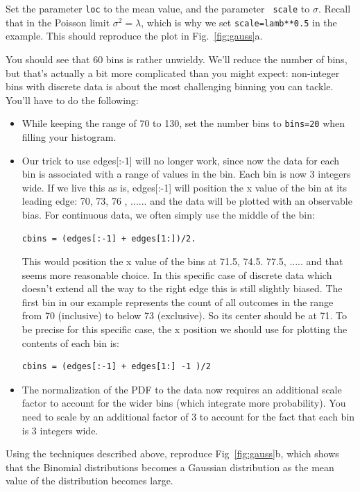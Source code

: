\begin{plot} Set the parameter {\tt loc} to the mean value, and the parameter {\tt
  scale} to $\sigma$.  Recall that in the Poisson limit $\sigma^2 =
\lambda$, which is why we set {\tt scale=lamb**0.5} in the example.
This should reproduce the plot in Fig.~\ref{fig:gauss}a. \end{plot}

You should see that 60 bins is rather unwieldy.  We'll reduce the number
of bins, but that's actually a bit more complicated than you might
expect: non-integer bins with discrete data is about the most
challenging binning you can tackle.  You'll have to do the following:
\begin{itemize}
\item While keeping the range of 70 to 130, set the number bins to {\tt bins=20} when filling your histogram.
\item Our trick to use edges[:-1] will no longer work, since now the data for each bin is associated with a range of values in the bin.  Each bin is now 3 integers wide. If we live this as is, edges[:-1] will position the x value of the bin at its leading edge: 70, 73, 76 , ......  and the data will be plotted with an observable bias.  For continuous data, we often simply use the middle of the bin:
\begin{verbatim}
cbins = (edges[:-1] + edges[1:])/2.  
\end{verbatim}
This would position the x value of the bins at 71.5, 74.5. 77.5, ..... and that seems more reasonable choice. 
In this specific case of discrete data which doesn't extend  all the way to the right edge this is still slightly biased. The first bin in our example represents the count of all outcomes in the range from 70 (inclusive) to below 73 (exclusive). So its center should be at 71.  To be precise for this specific case, the x position we should use for plotting the contents of each bin is:
\begin{verbatim}
cbins = (edges[:-1] + edges[1:] -1 )/2 
\end{verbatim}
\item The normalization of the PDF to the data now requires an additional scale factor to account for the wider bins (which integrate more probability).  You need to scale by an additional factor of 3 to account for the fact that each bin is 3 integers wide.
\end{itemize}

\begin{plot} Using the techniques described above, reproduce Fig~\ref{fig:gauss}b, which shows that the Binomial distributions becomes a Gaussian distribution as the mean value of the distribution becomes large. \end{plot}
























